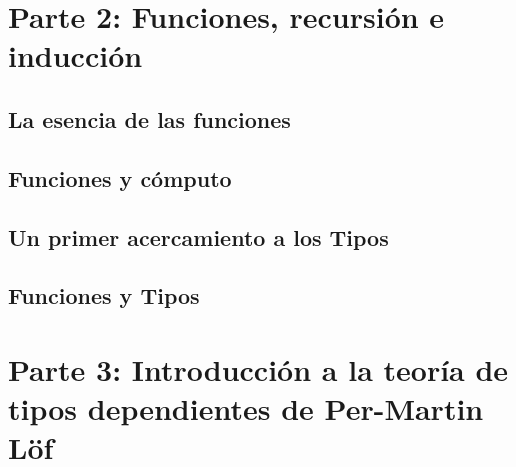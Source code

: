 \documentclass{article}
\begin{document}
\section{Parte 2: Funciones, recursión e inducción}
\subsection{La esencia de las funciones}

\subsection{Funciones y cómputo}



\subsection{Un primer acercamiento a los Tipos}


\subsection{Funciones y Tipos}

\section{Parte 3: Introducción a la teoría de tipos dependientes de Per-Martin Löf}
\end{document}

